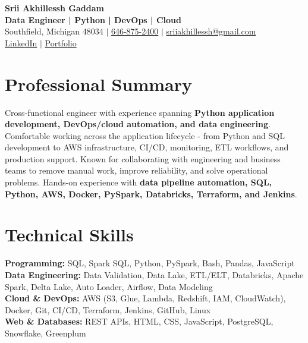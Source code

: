 \documentclass[letterpaper,10pt]{article}
\begin{document}
\fontsize{9.35pt}{10.45pt}\selectfont

\begin{center}
    {\LARGE \textbf{Srii Akhillessh Gaddam}} \\[-1pt]
    \textbf{Data Engineer | Python | DevOps | Cloud} \\[2pt]
    Southfield, Michigan 48034 $|$
    \href{tel:6468752400}{646-875-2400} $|$
    \href{mailto:sriiakhillessh@gmail.com}{sriiakhillessh@gmail.com} \\[1pt]
    \href{https://www.linkedin.com/in/srii-akhiilessh-gaddam-b48668191/}{LinkedIn} $|$
    \href{https://sriiakhillesshg.github.io/portfolio/}{Portfolio}
\end{center}
\vspace{-8pt}

\section{Professional Summary}
\small{Cross-functional engineer with experience spanning \textbf{Python application development, DevOps/cloud automation, and data engineering}. Comfortable working across the application lifecycle - from Python and SQL development to AWS infrastructure, CI/CD, monitoring, ETL workflows, and production support. Known for collaborating with engineering and business teams to remove manual work, improve reliability, and solve operational problems. Hands-on experience with \textbf{data pipeline automation, SQL, Python, AWS, Docker, PySpark, Databricks, Terraform, and Jenkins}.}

\section{Technical Skills}
\small{
\textbf{Programming:} SQL, Spark SQL, Python, PySpark, Bash, Pandas, JavaScript \\
\textbf{Data Engineering:} Data Validation, Data Lake, ETL/ELT, Databricks, Apache Spark, Delta Lake, Auto Loader, Airflow, Data Modeling \\
\textbf{Cloud \& DevOps:} AWS (S3, Glue, Lambda, Redshift, IAM, CloudWatch), Docker, Git, CI/CD, Terraform, Jenkins, GitHub, Linux \\
\textbf{Web \& Databases:} REST APIs, HTML, CSS, JavaScript, PostgreSQL, Snowflake, Greenplum
}
\end{document}
